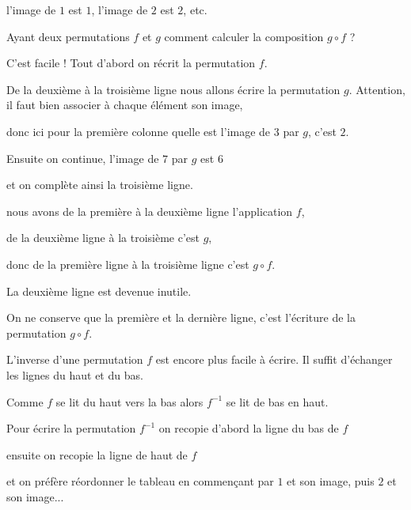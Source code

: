 l'image de $1$ est $1$, l'image de $2$ est $2$, etc.



\change

Ayant deux permutations $f$ et $g$ comment calculer la composition $g\circ f$ ?

\change

C'est facile ! Tout d'abord on récrit la permutation $f$.

\change

De la deuxième à la troisième ligne nous allons écrire la permutation $g$.
Attention, il faut bien associer à chaque élément son image,

donc ici pour la première colonne quelle est l'image de $3$ par $g$, c'est $2$.

\change

Ensuite on continue, l'image de $7$ par $g$ est $6$ 
 


et on complète ainsi la troisième ligne.

\change

nous avons de la première à la deuxième ligne l'application $f$,

de la deuxième ligne à la troisième c'est $g$,

donc de la première ligne à la troisième ligne c'est $g\circ f$.

\change

La deuxième ligne est devenue inutile.

\change

On ne conserve que la première et la dernière ligne, c'est l'écriture de la permutation $g\circ f$.

\change


L'inverse d'une permutation $f$ est encore plus facile à écrire.
Il suffit d'échanger les lignes du haut et du bas.

\change

Comme $f$ se lit du haut vers la bas alors $f^{-1}$ se lit de bas en haut.

\change

Pour écrire la permutation $f^{-1}$ on recopie d'abord la ligne du bas de $f$ 

\change

ensuite on recopie la ligne de haut de $f$

\change

et on préfère réordonner le tableau en commençant par $1$ et son image,
puis $2$ et son image...


\diapo

